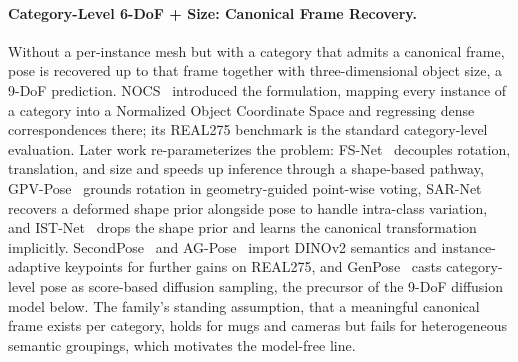 \paragraph{Category-Level 6-DoF + Size: Canonical Frame Recovery.}
Without a per-instance mesh but with a category that admits a canonical frame, pose is recovered up to that frame together with three-dimensional object size, a 9-DoF prediction.
NOCS~\cite{Wang0HVSG19} introduced the formulation, mapping every instance of a category into a Normalized Object Coordinate Space and regressing dense correspondences there; its REAL275 benchmark is the standard category-level evaluation.
Later work re-parameterizes the problem: FS-Net~\cite{chen2021fsnet} decouples rotation, translation, and size and speeds up inference through a shape-based pathway, GPV-Pose~\cite{di2022gpvpose} grounds rotation in geometry-guided point-wise voting, SAR-Net~\cite{lin2022sarnet} recovers a deformed shape prior alongside pose to handle intra-class variation, and IST-Net~\cite{liu2023istnet} drops the shape prior and learns the canonical transformation implicitly.
SecondPose~\cite{chen2024secondpose} and AG-Pose~\cite{lin2024agpose} import DINOv2 semantics and instance-adaptive keypoints for further gains on REAL275, and GenPose~\cite{zhang2023genpose} casts category-level pose as score-based diffusion sampling, the precursor of the 9-DoF diffusion model below.
The family's standing assumption, that a meaningful canonical frame exists per category, holds for mugs and cameras but fails for heterogeneous semantic groupings, which motivates the model-free line.

